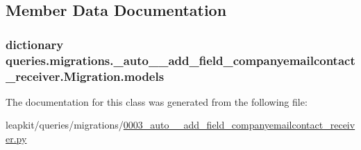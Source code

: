 \subsection{Member Data Documentation}
\hypertarget{classqueries_1_1migrations_1_10003__auto____add__field__companyemailcontact__receiver_1_1_migration_a864569864ef255383c67b1300710bea0}{
\subsubsection[{models}]{\setlength{\rightskip}{0pt plus 5cm}dictionary queries.\-migrations.\-\_\-auto\-\_\-\-\_\-add\-\_\-field\-\_\-companyemailcontact\-\_\-receiver.\-Migration.\-models\hspace{0.3cm}{\ttfamily [static]}}}\label{classqueries_1_1migrations_1_10003__auto____add__field__companyemailcontact__receiver_1_1_migration_a864569864ef255383c67b1300710bea0}


The documentation for this class was generated from the following file\-:\begin{DoxyCompactItemize}
\item 
leapkit/queries/migrations/\hyperlink{0003__auto____add__field__companyemailcontact__receiver_8py}{0003\-\_\-auto\-\_\-\-\_\-add\-\_\-field\-\_\-companyemailcontact\-\_\-receiver.\-py}\end{DoxyCompactItemize}
